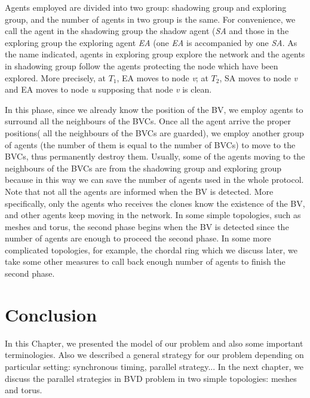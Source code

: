   Agents employed are divided into two group: shadowing group and exploring group, and the number of agents in two group is the same. For convenience, we call the agent in the shadowing group the shadow agent ({\em SA} and those in the exploring group the exploring agent {\em EA} (one {\em EA} is accompanied by one {\em SA}. As the name indicated, agents in exploring group explore the network and the agents in shadowing group follow the agents  protecting the node which have been explored. More precisely, at $T_1$, EA moves to node {\em v}; at $T_2$, SA moves to node {\em v} and EA moves to node {\em u} supposing that node {\em v} is clean. 

In this phase, since we already know the position of the BV, we employ agents to surround all the neighbours of the BVCs. Once all the agent arrive the proper positions( all the neighbours of the BVCs are guarded), we employ another group of agents (the number of them is equal to the number of BVCs) to move to the BVCs, thus permanently destroy them. Usually, some of the agents moving to the neighbours of the BVCs are from the shadowing group and exploring group because in this way we can save the number of agents used in the whole protocol. Note that not all the agents are informed when the BV is detected. More specifically, only the agents who receives the clones know the existence of the BV, and other agents keep moving in the network. In some simple topologies, such as meshes and torus, the second phase begins when the BV is detected since the number of agents are enough to proceed the second phase. In some more complicated topologies, for example, the chordal ring which we discuss later, we take some other measures to call back enough number of agents to finish the second phase.

\section{Conclusion}
In this Chapter, we presented the model of our problem and also some important terminologies. Also we described a general strategy for our problem depending on particular setting: synchronous timing, parallel strategy... In the next chapter, we discuss the parallel strategies in BVD problem in two simple topologies: meshes and torus.







 



